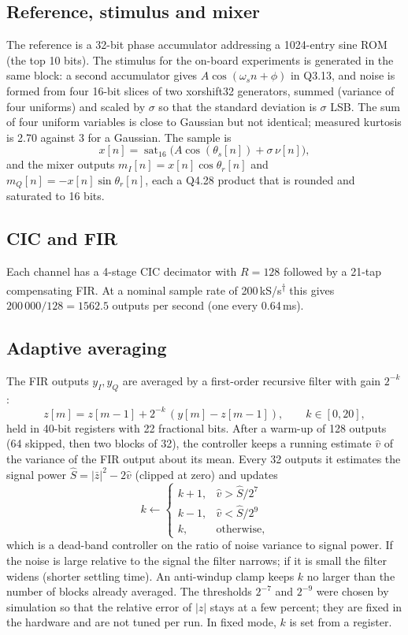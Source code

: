 \documentclass[journal]{IEEEtran}
\newcommand{\nom}{\textsuperscript{$\dagger$}}
\begin{document}
\subsection{Reference, stimulus and mixer}
The reference is a 32-bit phase accumulator addressing a 1024-entry sine ROM (the top 10 bits). The stimulus for the on-board experiments is generated in the same block: a second accumulator gives $A\cos(\omega_s n+\phi)$ in Q3.13, and noise is formed from four 16-bit slices of two xorshift32 generators, summed (variance of four uniforms) and scaled by $\sigma$ so that the standard deviation is $\sigma$ LSB. The sum of four uniform variables is close to Gaussian but not identical; measured kurtosis is 2.70 against 3 for a Gaussian. The sample is
\begin{equation}
x[n]=\operatorname{sat}_{16}\!\big(A\cos(\theta_s[n])+\sigma\,\nu[n]\big),
\end{equation}
and the mixer outputs $m_I[n]=x[n]\cos\theta_r[n]$ and $m_Q[n]=-x[n]\sin\theta_r[n]$, each a Q4.28 product that is rounded and saturated to 16 bits.

\subsection{CIC and FIR}
Each channel has a 4-stage CIC decimator with $R=128$ followed by a 21-tap compensating FIR. At a nominal sample rate of 200\,kS/s\nom{} this gives $200\,000/128=1562.5$ outputs per second (one every 0.64\,ms).

\subsection{Adaptive averaging}\label{sec:adapt}
The FIR outputs $y_I,y_Q$ are averaged by a first-order recursive filter with gain $2^{-k}$:
\begin{equation}
z[m]=z[m-1]+2^{-k}\,(y[m]-z[m-1]),\qquad k\in[0,20],
\end{equation}
held in 40-bit registers with 22 fractional bits. After a warm-up of 128 outputs (64 skipped, then two blocks of 32), the controller keeps a running estimate $\hat v$ of the variance of the FIR output about its mean. Every 32 outputs it estimates the signal power $\hat S=|\bar z|^2-2\hat v$ (clipped at zero) and updates
\begin{equation}
k\leftarrow\begin{cases}k+1,&\hat v>\hat S/2^{7}\\ k-1,&\hat v<\hat S/2^{9}\\ k,&\text{otherwise,}\end{cases}
\end{equation}
which is a dead-band controller on the ratio of noise variance to signal power. If the noise is large relative to the signal the filter narrows; if it is small the filter widens (shorter settling time). An anti-windup clamp keeps $k$ no larger than the number of blocks already averaged. The thresholds $2^{-7}$ and $2^{-9}$ were chosen by simulation so that the relative error of $|z|$ stays at a few percent; they are fixed in the hardware and are not tuned per run. In fixed mode, $k$ is set from a register.
\end{document}

